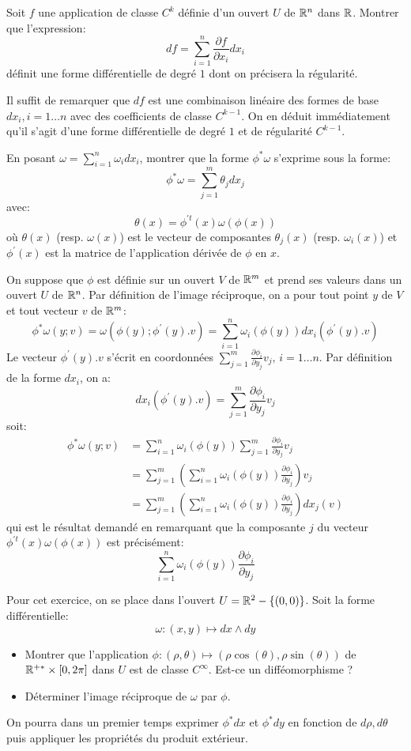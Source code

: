\documentclass[a4paper, 12pt]{amsart}
\begin{document}
\begin{fex}
Soit $f$ une application de classe $C^k$ définie d'un ouvert $U$ de $\mathbb{R}^n$ dans $\mathbb{R}$. Montrer que l'expression:
\[
df = \sum_{i=1}^n \frac{\partial f}{\partial x_i} dx_i
\] 
définit une forme différentielle de degré $1$ dont on précisera la régularité.

\end{fex}
Il suffit de remarquer que $df$ est une combinaison linéaire des formes de base $dx_i, i=1\dots n$ avec des coefficients de classe $C^{k-1}$. On en déduit immédiatement qu'il s'agit d'une forme différentielle de degré $1$ et de régularité $C^{k-1}$.
\begin{fex}
En posant $\omega = \sum_{i=1}^n \omega_i dx_i$,
montrer que la forme $\phi^*\omega$ s'exprime sous la forme:
\[
\phi^*\omega = \sum_{j=1}^m \theta_j dx_j
\]
avec:
\[
\theta(x) = \phi^{\prime t} (x) \omega(\phi(x)) 
\]
où $\theta(x)$ (resp. $\omega(x)$) est le vecteur de composantes $\theta_j(x)$ (resp. $\omega_i(x)$) et $\phi^\prime(x)$ est la matrice de l'application dérivée de $\phi$ en $x$.
\end{fex}
On suppose que $\phi$ est définie sur un ouvert $V$ de $\mathbb{R}^m$ et prend ses valeurs dans un ouvert $U$ de $\mathbb{R}^n$. 
Par définition de l'image réciproque, on a pour tout point $y$ de $V$ et tout vecteur $v$ de $\mathbb{R}^m$:
\[
\phi^*\omega(y;v) = \omega(\phi(y);\phi^\prime(y).v) = \sum_{i=1}^n \omega_i(\phi(y)) dx_i(\phi^\prime(y).v)
\]
Le vecteur $\phi^\prime(y).v$ s'écrit en coordonnées $\sum_{j=1}^m \frac{\partial \phi_i}{\partial y_j} v_j, \, i=1\dots n$. Par définition de la forme $dx_i$, on a:
\[
dx_i(\phi^\prime(y).v) = \sum_{j=1}^m \frac{\partial \phi_i}{\partial y_j} v_j
\]
soit:
\begin{align*}
\phi^*\omega(y;v) &= \sum_{i=1}^n \omega_i(\phi(y))\sum_{j=1}^m \frac{\partial \phi_i}{\partial y_j} v_j\\
&= \sum_{j=1}^m \left(\sum_{i=1}^n \omega_i(\phi(y)) \frac{\partial \phi_i}{\partial y_j} \right) v_j \\
&= \sum_{j=1}^m \left(\sum_{i=1}^n \omega_i(\phi(y)) \frac{\partial \phi_i}{\partial y_j} \right) dx_j(v)
\end{align*}
qui est le résultat demandé en remarquant que la composante $j$ du vecteur $\phi^{\prime t} (x) \omega(\phi(x)) $ est précisément:
\[
\sum_{i=1}^n \omega_i(\phi(y)) \frac{\partial \phi_i}{\partial y_j}
\]
\begin{fex}
Pour cet exercice, on se place dans l'ouvert $U = \mathbb{R}^2-\{(0,0)\}$. Soit la forme différentielle:
\[
\omega \colon (x,y) \mapsto dx \wedge dy
\]
\begin{itemize}
\item Montrer que l'application $\phi \colon (\rho,\theta) \mapsto (\rho \cos(\theta), \rho \sin(\theta))$ de $\mathbb{R}^{+*}\times [0,2\pi]$ dans $U$ est de classe $C^\infty$. Est-ce un difféomorphisme ?
\item Déterminer l'image réciproque de $\omega$ par $\phi$. 
\end{itemize}
On pourra dans un premier temps exprimer $\phi^*dx$ et $\phi^*dy$ en fonction de $d\rho, d\theta$ puis appliquer les propriétés du produit extérieur.
\end{fex}
\end{document}
